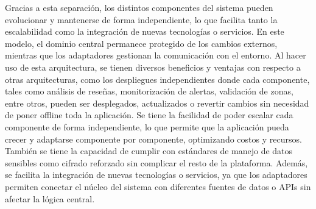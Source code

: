 \begin{itemize}
Gracias a esta separación, los distintos componentes del sistema pueden evolucionar y mantenerse de forma independiente, lo que facilita tanto la escalabilidad como la integración de nuevas tecnologías o servicios. En este modelo, el dominio central permanece protegido de los cambios externos, mientras que los adaptadores gestionan la comunicación con el entorno.
Al hacer uso de esta arquitectura, se tienen diversos beneficios y ventajas con respecto a otras arquitecturas, como los despliegues independientes donde cada componente, tales como análisis de reseñas, monitorización de alertas, validación de zonas, entre otros, pueden ser desplegados, actualizados o revertir cambios sin necesidad de poner offline toda la aplicación. 
Se tiene la facilidad de poder escalar cada componente de forma independiente, lo que permite que la aplicación pueda crecer y adaptarse componente por componente, optimizando costos y recursos. También se tiene la capacidad de cumplir con estándares de manejo de datos sensibles como cifrado reforzado sin complicar el resto de la plataforma. Además, se facilita la integración de nuevas tecnologías o servicios, ya que los adaptadores permiten conectar el núcleo del sistema con diferentes fuentes de datos o APIs sin afectar la lógica central.


\end{itemize}
